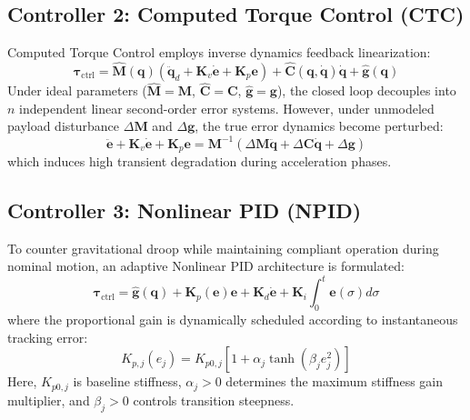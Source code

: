 \documentclass[journal,10pt,twocolumn]{IEEEtran}
\begin{document}
\subsection{Controller 2: Computed Torque Control (CTC)}
Computed Torque Control employs inverse dynamics feedback linearization:
\begin{equation}
    \bm{\tau}_{\text{ctrl}} = \hat{\bm{M}}(\bm{q}) \left( \ddot{\bm{q}}_d + \bm{K}_v \dot{\bm{e}} + \bm{K}_p \bm{e} \right) + \hat{\bm{C}}(\bm{q}, \dot{\bm{q}})\dot{\bm{q}} + \hat{\bm{g}}(\bm{q})
\end{equation}
Under ideal parameters ($\hat{\bm{M}} = \bm{M}$, $\hat{\bm{C}} = \bm{C}$, $\hat{\bm{g}} = \bm{g}$), the closed loop decouples into $n$ independent linear second-order error systems. However, under unmodeled payload disturbance $\Delta \bm{M}$ and $\Delta \bm{g}$, the true error dynamics become perturbed:
\begin{equation}
    \ddot{\bm{e}} + \bm{K}_v \dot{\bm{e}} + \bm{K}_p \bm{e} = \bm{M}^{-1} \left( \Delta \bm{M} \ddot{\bm{q}} + \Delta \bm{C} \dot{\bm{q}} + \Delta \bm{g} \right)
\end{equation}
which induces high transient degradation during acceleration phases.

\subsection{Controller 3: Nonlinear PID (NPID)}
To counter gravitational droop while maintaining compliant operation during nominal motion, an adaptive Nonlinear PID architecture is formulated:
\begin{equation}
    \bm{\tau}_{\text{ctrl}} = \hat{\bm{g}}(\bm{q}) + \bm{K}_p(\bm{e}) \bm{e} + \bm{K}_d \dot{\bm{e}} + \bm{K}_i \int_0^t \bm{e}(\sigma) d\sigma
\end{equation}
where the proportional gain is dynamically scheduled according to instantaneous tracking error:
\begin{equation}
    K_{p,j}(e_j) = K_{p0,j} \left[ 1 + \alpha_j \tanh(\beta_j e_j^2) \right]
\end{equation}
Here, $K_{p0,j}$ is baseline stiffness, $\alpha_j > 0$ determines the maximum stiffness gain multiplier, and $\beta_j > 0$ controls transition steepness.
\end{document}
